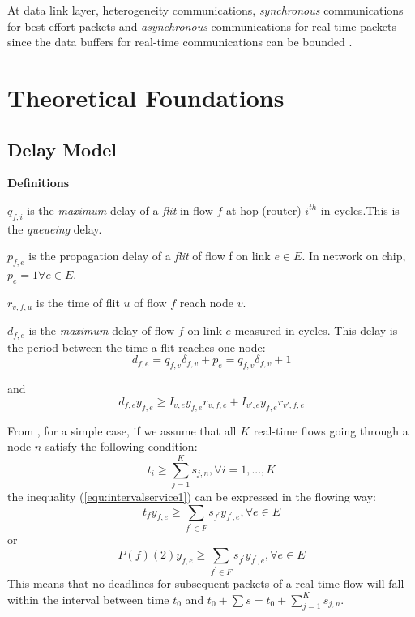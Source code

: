 \documentclass[10pt]{article}
\begin{document}
At data link layer,  heterogeneity communications, {\em synchronous} communications 
for best effort packets and {\em asynchronous} communications for real-time packets 
since the data buffers for real-time communications can be bounded \cite{Ferrari90ascheme}.

\section{Theoretical Foundations}
\subsection{Delay Model}

{\textbf{Definitions}}

$q_{f,i}$ is the {\em maximum} delay of a {\em flit} in flow $f$ at
hop (router) $i^{th}$ in cycles.This is the {\em queueing} delay.
 
$p_{f,e}$ is the propagation delay of a {\em flit} of flow f on link $e
\in E$. In network on chip, $p_e=1 \forall e \in E$.

$r_{v,f,u}$ is the time of flit $u$ of flow $f$ reach node $v$.  

$d_{f,e}$ is the {\em maximum} delay of flow $f$ on link $e$ measured in
cycles. This delay is the period between the time a flit reaches one node:
\begin{equation}\label{equ:edgeDelay}
d_{f,e} = q_{f,v}\delta_{f,v} + p_{e} = q_{f,v}\delta_{f,v} + 1 
\end{equation}

and
\begin{equation} 
d_{f,e}y_{f,e} \geq I_{v,e}y_{f,e}r_{v,f,e} + I_{v',e}y_{f,e}r_{v',f,e}
\end{equation}

From \cite{Ferrari90ascheme}, for a simple case, if we assume that all $K$ 
real-time flows going through a node $n$ satisfy the following condition:
\begin{equation}\label{equ:intervalservice1}
t_i \geq \sum_{j=1}^Ks_{j,n}, \forall i = 1,...,K
\end{equation}
the inequality (\ref{equ:intervalservice1}) can be expressed in the flowing way:
\begin{equation}
t_f y_{f,e}\geq \sum_{f^{'} \in F} s_{f^{'}}y_{f^{'},e}, \forall e \in E
\end{equation}
or
\begin{equation}
P(f)(2) y_{f,e}\geq \sum_{f^{'} \in F} s_{f^{'}}y_{f^{'},e}, \forall e \in E
\end{equation}
This means that no deadlines for subsequent packets of a real-time flow will fall within the interval 
between time $t_0$ and $t_0 + \sum s = t_0 + \sum_{j=1}^Ks_{j,n}$. 
\end{document}
